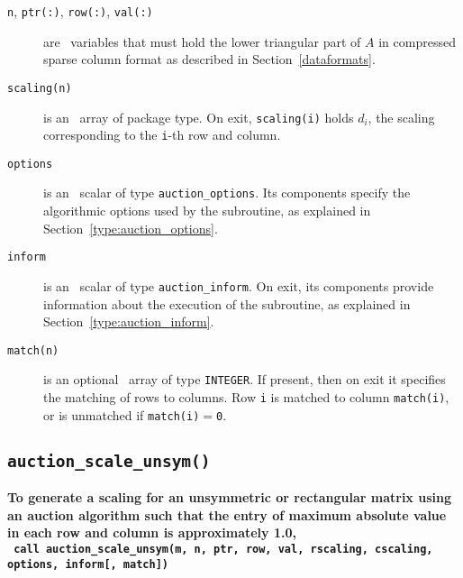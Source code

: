 \begin{description}

\item[\texttt{n}, \texttt{ptr(:)}, \texttt{row(:)}, \texttt{val(:)}] are \intentin\ variables that must hold the lower triangular part of $A$ in compressed sparse column format as described in Section~\ref{dataformats}.

\item[\texttt{scaling(n)}] is an \intentout\ array of package type. On exit,
\texttt{scaling(i)} holds $d_i$, the scaling corresponding to the
\texttt{i}-th row and column.

\item[\texttt{options}] is an \intentin\ scalar of type \texttt{auction\_options}. Its components specify the algorithmic options used by the subroutine, as explained in Section~\ref{type:auction_options}.

\item[\texttt{inform}] is an \intentout\ scalar of type \texttt{auction\_inform}. On exit, its components provide information about the execution of the subroutine, as explained in Section~\ref{type:auction_inform}.

\item[\texttt{match(n)}] is an optional \intentout\ array of type {\tt INTEGER}. If present, then on exit it specifies the matching of rows to
columns. Row \texttt{i} is matched to column \texttt{match(i)}, or is unmatched
if \texttt{match(i)}$=$\texttt{0}.

\end{description}

\subsection{\texttt{auction\_scale\_unsym()}}

\textbf{\noindent
   To generate a scaling for an unsymmetric or rectangular matrix using an auction algorithm such that the entry of maximum absolute value in each row and column is approximately 1.0,
   \vspace*{0.3cm} \\
   \texttt{ \hspace*{0.2cm}
      call auction\_scale\_unsym(m, n, ptr, row, val, rscaling, cscaling, options, inform[, match])
   }
}

